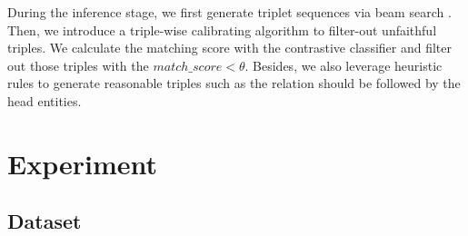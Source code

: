 \documentclass[letterpaper]{article} \usepackage{aaai21}  \usepackage{times}  \usepackage{helvet} \usepackage{courier}  \usepackage[hyphens]{url}  \usepackage{graphicx} \urlstyle{rm} \def\UrlFont{\rm}  \usepackage{natbib}  \usepackage[noend]{algpseudocode}
\begin{document}
During the inference stage, we first generate triplet sequences via beam search \cite{wiseman2016sequence}. Then, we introduce a triple-wise calibrating algorithm to filter-out unfaithful triples. We calculate the matching score with the contrastive classifier and filter out those triples with the $match\_score < \theta$. Besides, we also leverage heuristic rules to generate reasonable triples such as the relation should be followed by the head entities. 
\iffalse
\begin{algorithm}[th]
\begin{algorithmic}[1]
\caption{Inference with Triple-wise Calibrating} 
 \State \textbf{Require:} Test instances $X={x_1,...,x_M}$,   beam  size $q$, match threshold $\theta$, prediction $Triple = \Phi$
   \For{$u$ in X}
    \State $(h^{t},r^{t},t^{t})$ = Autogresstive\_Generate($x_i$,$q$)
    \State match\_score =  Contrastive\_Classify($x_i,(h^{t},r^{t},t^{t})$)
    \If{match\_score $\ge$ $\theta$}
    \State    $Triple$ $\leftarrow$ $Triple$ $\cap$ $(h^{t},r^{t},t^{t})$
     \Else
     \State   continue
    \EndIf
    \EndFor
   \State return $Triple$
\label{batch} 
\end{algorithmic}
\end{algorithm}
\fi
\section{Experiment}
\subsection{Dataset}
\end{document}
